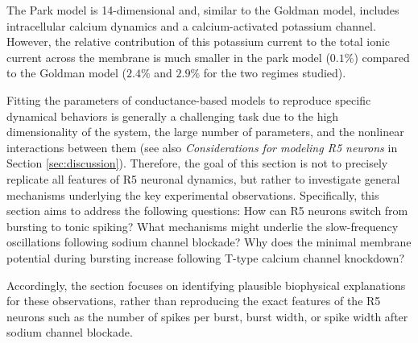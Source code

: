 \documentclass[../main.tex]{subfiles}
\begin{document}
The Park model is 14-dimensional and, similar to the Goldman model, includes intracellular calcium dynamics and a calcium-activated potassium channel. However, the relative contribution of this potassium current to the total ionic current across the membrane is much smaller in the park model ($0.1\%$) compared to the Goldman model ($2.4\%$ and $2.9\%$ for the two regimes studied).

Fitting the parameters of conductance-based models to reproduce specific dynamical behaviors is generally a challenging task due to the high dimensionality of the system, the large number of parameters, and the nonlinear interactions between them \parencite{alonsoVisualizationCurrentsNeural2019} (see also \textit{Considerations for modeling R5 neurons} in Section \ref{sec:discussion}). Therefore, the goal of this section is not to precisely replicate all features of R5 neuronal dynamics, but rather to investigate general mechanisms underlying the key experimental observations.
Specifically, this section aims to address the following questions: How can R5 neurons switch from bursting to tonic spiking? What mechanisms might underlie the slow-frequency oscillations following sodium channel blockade? Why does the minimal membrane potential during bursting increase following T-type calcium channel knockdown?

Accordingly, the section focuses on identifying plausible biophysical explanations for these observations, rather than reproducing the exact features of the R5 neurons such as the number of spikes per burst, burst width, or spike width after sodium channel blockade.
\end{document}
